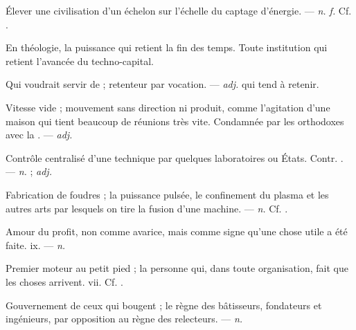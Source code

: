  Élever une civilisation d'un échelon sur l'échelle du captage d'énergie. ---  \textit{n. f.} Cf. .

  En théologie, la puissance qui retient la fin des temps.   Toute institution qui retient l'avancée du techno-capital.

 Qui voudrait servir de  ; retenteur par vocation. ---  \textit{adj.} qui tend à retenir.

 Vitesse vide ; mouvement sans direction ni produit, comme l'agitation d'une maison qui tient beaucoup de réunions très vite. Condamnée par les orthodoxes avec la . ---  \textit{adj.}

 Contrôle centralisé d'une technique par quelques laboratoires ou États. Contr. . ---  \textit{n.} ;  \textit{adj.}

 Fabrication de foudres ; la puissance pulsée, le confinement du plasma et les autres arts par lesquels on tire la fusion d'une machine. ---  \textit{n.} Cf. .

 Amour du profit, non comme avarice, mais comme signe qu'une chose utile a été faite.   ix. ---  \textit{n.}

 Premier moteur au petit pied ; la personne qui, dans toute organisation, fait que les choses arrivent.   vii. Cf. .

 Gouvernement de ceux qui bougent ; le règne des bâtisseurs, fondateurs et ingénieurs, par opposition au règne des relecteurs. ---  \textit{n.}

